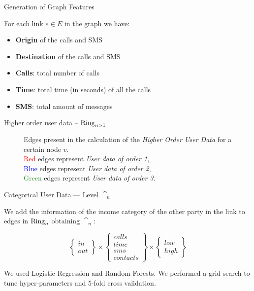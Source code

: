 \documentclass[usenames,dvipsnames]{beamer}
\begin{document}
\begin{frame}{Generation of Graph Features}

For each link $e \in E$ in the graph we have:

\begin{itemize}
	\item \textbf{Origin} of the calls and SMS
	\item \textbf{Destination} of the calls and SMS
	\item \textbf{Calls}: total number of calls
	\item \textbf{Time}: total time (in seconds) of all the calls
	\item \textbf{SMS}: total amount of messages
\end{itemize}

\end{frame}


\begin{frame}{Higher order user data -- $\operatorname{Ring}_{n > 1}$ }

\begin{figure}
\centering
\framebox[\columnwidth]{%
	
}
\caption{Edges present in the calculation of the \emph{Higher Order User Data} for a certain node $v$. \\
\textcolor{red}{Red} edges represent \emph{User data of order 1},\\
 \textcolor{blue}{Blue} edges represent \emph{User data of order 2}, \\
 \textcolor{ForestGreen}{Green} edges represent \emph{User data of order 3}.}
\label{fig:higherorderuserdata}
\end{figure}


\end{frame}


\begin{frame}{Categorical User Data --- Level $\cat_n$}

We add the information of the income category of the other party in the link to 
edges in $\operatorname{Ring}_{n}$ obtaining $\cat_n$:

\begin{equation*}
\begin{Bmatrix} in \\ out \end{Bmatrix}
\times
\begin{Bmatrix} calls \\ time \\ sms \\ contacts \end{Bmatrix}
\times
\begin{Bmatrix} low \\ high \end{Bmatrix}
\label{eq:matcatuserdata}
\end{equation*}


We used Logistic Regression and Random Forests. We performed a grid search to tune hyper-parameters and 5-fold cross validation.  
\end{frame}
\end{document}
